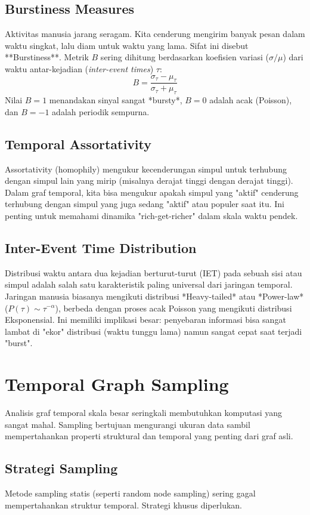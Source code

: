 \documentclass[12pt,a4paper]{book}
\begin{document}
\section{Burstiness Measures}
Aktivitas manusia jarang seragam. Kita cenderung mengirim banyak pesan dalam waktu singkat, lalu diam untuk waktu yang lama. Sifat ini disebut **Burstiness**.
Metrik $B$ sering dihitung berdasarkan koefisien variasi ($\sigma / \mu$) dari waktu antar-kejadian (\textit{inter-event times}) $\tau$:
$$ B = \frac{\sigma_\tau - \mu_\tau}{\sigma_\tau + \mu_\tau} $$
Nilai $B=1$ menandakan sinyal sangat *bursty*, $B=0$ adalah acak (Poisson), dan $B=-1$ adalah periodik sempurna.

\section{Temporal Assortativity}
Assortativity (homophily) mengukur kecenderungan simpul untuk terhubung dengan simpul lain yang mirip (misalnya derajat tinggi dengan derajat tinggi).
Dalam graf temporal, kita bisa mengukur apakah simpul yang "aktif" cenderung terhubung dengan simpul yang juga sedang "aktif" atau populer saat itu. Ini penting untuk memahami dinamika "rich-get-richer" dalam skala waktu pendek.

\section{Inter-Event Time Distribution}
Distribusi waktu antara dua kejadian berturut-turut (IET) pada sebuah sisi atau simpul adalah salah satu karakteristik paling universal dari jaringan temporal.
Jaringan manusia biasanya mengikuti distribusi *Heavy-tailed* atau *Power-law* ($P(\tau) \sim \tau^{-\alpha}$), berbeda dengan proses acak Poisson yang mengikuti distribusi Eksponensial. Ini memiliki implikasi besar: penyebaran informasi bisa sangat lambat di "ekor" distribusi (waktu tunggu lama) namun sangat cepat saat terjadi "burst".

\chapter{Temporal Graph Sampling}
Analisis graf temporal skala besar seringkali membutuhkan komputasi yang sangat mahal. Sampling bertujuan mengurangi ukuran data sambil mempertahankan properti struktural dan temporal yang penting dari graf asli.

\section{Strategi Sampling}
Metode sampling statis (seperti random node sampling) sering gagal mempertahankan struktur temporal. Strategi khusus diperlukan.
\end{document}
